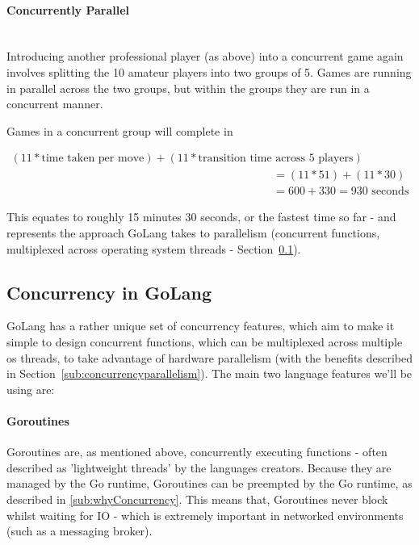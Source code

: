 \paragraph{Concurrently Parallel} \mbox{}\\

Introducing another professional player (as above) into a concurrent game again
involves splitting the 10 amateur players into two groups of 5. Games are
running in parallel across the two groups, but within the groups they are run in
a concurrent manner.

Games in a concurrent group will complete in

\begin{equation}
  \begin{split}
    (11 * \text{time taken per move}) + (11 * \text{transition time across 5 players}) \\
    &= (11 * 51) + (11 * 30) \\
    &= 600 + 330 = 930 \text{ seconds}
  \end{split}
\end{equation}

This equates to roughly 15 minutes 30 seconds, or the fastest time so far - and
represents the approach GoLang takes to parallelism (concurrent functions,
multiplexed across operating system threads -
Section~\ref{sub:golangConcurrency}).

\subsection{Concurrency in GoLang}
\label{sub:golangConcurrency}

GoLang has a rather unique set of concurrency features, which aim to make it
simple to design concurrent functions, which can be multiplexed across multiple
\gls{os} threads, to take advantage of hardware parallelism (with the benefits
described in Section~\ref{sub:concurrencyparallelism}). The main two language features we'll be using are:

\paragraph{Goroutines}

Goroutines are, as mentioned above, concurrently executing functions - often
described as 'lightweight threads' by the languages creators.
Because they are managed by the Go runtime, Goroutines can be \gls{preempted} by
the Go runtime, as described in \ref{sub:whyConcurrency}. This means that,
Goroutines never block whilst waiting for IO - which is extremely important in
networked environments (such as a messaging broker).


